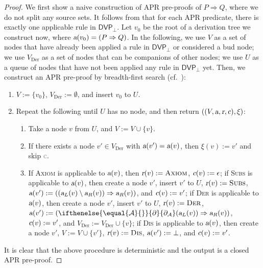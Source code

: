 \documentclass[10pt,a4paper]{article}
\newcommand{\Bfnum}[1]{\textcolor{darkgray}{\rm\sffamily\bfseries #1}}
\def\cA{\mathcal{A}}
\def\cR{\mathcal{R}}
\newcommand{\ReachPred}[2]{#1 \Rightarrow #2}
\newcommand{\Derivative}[1][\cR]{\ifthenelse{\equal{#1}{}}{\partial}{\partial_{#1}}}
\newcommand{\RuleName}[1]{{\rm \textsc{#1}}}
\newcommand{\CDVPnew}[1][]{\mathsf{DVP}_\bot}
\newcommand{\varsl}[1]{\mbox{\sl #1}}
\def\Vder{V_{\mathrm{Der}}}
\begin{document}
\ThmFinitenessAndDecidabilityOfAPRPredicate*
\begin{proof}
	We first show a naive construction of APR pre-proofs of $\ReachPred{P}{Q}$, where we do not split any source sets.
	It follows from  that for each APR predicate, there is exactly one applicable rule in $\CDVPnew$.
	Let $v_0$ be the root of a derivation tree we construct now, where $\varsl{a}(v_0) = (\ReachPred{P}{Q})$.
	In the following, we use $V$ as a set of nodes that have already been applied a rule in $\CDVPnew$ or considered a bud node;
	we use $\Vder$ as a set of nodes that can be companions of other nodes;
	we use $U$ as a queue of nodes that have not been applied any rule in $\CDVPnew$ yet.
	Then, we construct an APR pre-proof by breadth-first search (cf.~\cite{KN24jip}):
	\begin{enumerate}
		\item $V := \{v_0\}$, $\Vder := \emptyset$, and insert $v_0$ to $U$.
		\item Repeat the following until $U$ has no node, and then return $((V,\varsl{a},\varsl{r},\varsl{c}),\xi)$:
		      \begin{enumerate}
			      \item Take a node $v$ from $U$, and $V := V \cup \{ v \}$.
			      \item If there exists a node $v' \in \Vder$ with $\varsl{a}(v') = \varsl{a}(v)$,
			            then $\xi(v) := v'$ and skip \Bfnum{c}.
			      \item If \RuleName{Axiom} is applicable to $\varsl{a}(v)$,
			            then
			            $\varsl{r}(v) := \mbox{\RuleName{Axiom}}$, $\varsl{c}(v) := \epsilon$;
			            if \RuleName{Subs} is applicable to $\varsl{a}(v)$,
			            then
			            create a node $v'$, insert $v'$ to $U$, $\varsl{r}(v) := \mbox{\RuleName{Subs}}$,
			            $\varsl{a}(v') := (\ReachPred{(\varsl{a}_L(v)\setminus\varsl{a}_R(v))}{\varsl{a}_R(v)})$,
			            and
			            $\varsl{c}(v) := v'$;
			            if \RuleName{Der} is applicable to $\varsl{a}(v)$,
			            then
			            create a node $v'$, insert $v'$ to $U$, $\varsl{r}(v) := \mbox{\RuleName{Der}}$,
			            $\varsl{a}(v') := (\ReachPred{\Derivative[\cA](\varsl{a}_L(v))}{\varsl{a}_R(v)})$,
			            $\varsl{c}(v) := v'$,
			            and
			            $\Vder := \Vder \cup \{ v \}$;
			            if \RuleName{Dis} is applicable to $\varsl{a}(v)$,
			            then
			            create a node $v'$, $V := V \cup \{ v' \}$, $\varsl{r}(v) := \mbox{\RuleName{Dis}}$,
			            $\varsl{a}(v') := \bot$,
			            and
			            $\varsl{c}(v) := v'$.
		      \end{enumerate}
	\end{enumerate}
	It is clear that the above procedure is deterministic and the output is a closed APR pre-proof.


\end{proof}
\end{document}

